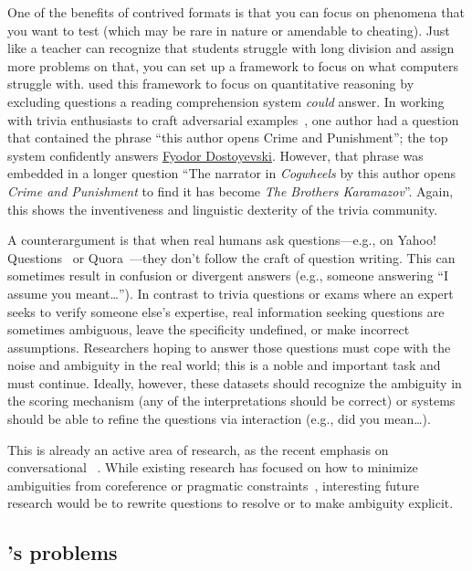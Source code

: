 One of the benefits of contrived formats is that you can focus on phenomena that you want to test (which may be rare in nature or amendable to cheating). 
Just like a teacher can recognize that students struggle with long division and assign more problems on that, you can set up a framework to focus on what computers struggle with.
 used this framework to focus on quantitative reasoning by excluding questions a reading comprehension system \emph{could} answer.
In working with trivia enthusiasts to craft adversarial examples~\cite{wallace-19}, one author had a question that contained the phrase ``this author opens Crime and Punishment''; the top system confidently answers \underline{Fyodor Dostoyevski}.
However, that phrase was embedded in a longer question ``The narrator in \textit{Cogwheels} by this author opens \textit{Crime and Punishment} to find it has become \textit{The Brothers Karamazov}''. 
Again, this shows the inventiveness and linguistic dexterity of the trivia community.

A counterargument is that when real humans ask questions---e.g., on Yahoo! Questions~\cite{szpektor-13} or Quora~\cite{iyer-17}---they don't follow the craft of question writing.
This can sometimes result in confusion or divergent answers (e.g., someone answering ``I assume you meant\dots'').
In contrast to trivia questions or exams where an expert seeks to verify someone else's expertise, real information seeking questions  are sometimes ambiguous, leave the specificity undefined, or make incorrect assumptions.
Researchers hoping to answer those questions must cope with the noise and ambiguity in the real world; this is a noble and important task and must continue.
Ideally, however, these datasets should recognize the ambiguity in the scoring mechanism (any of the interpretations should be correct) or systems should be able to refine the questions via interaction (e.g., did you mean\dots).

This is already an active area of research, as the recent emphasis on conversational ~\cite{reddy-18,choi-18}.
While existing research has focused on how to minimize ambiguities from coreference or pragmatic constraints~\cite{elgohary-19}, interesting future research would be to rewrite questions to resolve or to make ambiguity explicit.


\subsection{\qb{}'s problems}

